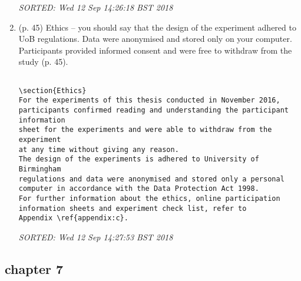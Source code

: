 \documentclass[10pt]{article}
\begin{document}
\begin{enumerate}[noitemsep,topsep=0pt]
\begin{verbatim}
\end{verbatim}
\textit{
SORTED: 
Wed 12 Sep 14:26:18 BST 2018
}
\\






\item (p. 45) Ethics -- you should say that the design of the experiment 
	adhered to UoB regulations. 
	Data were anonymised and stored only on your computer.
	Participants provided informed consent and were free to 
	withdraw from the study	(p. 45).


\begin{verbatim}

\section{Ethics}
For the experiments of this thesis conducted in November 2016, 
participants confirmed reading and understanding the participant information 
sheet for the experiments and were able to withdraw from the experiment 
at any time without giving any reason.
The design of the experiments is adhered to University of Birmingham 
regulations and data were anonymised and stored only a personal 
computer in accordance with the Data Protection Act 1998.
For further information about the ethics, online participation 
information sheets and experiment check list, refer to 
Appendix \ref{appendix:c}.

\end{verbatim}
\textit{
SORTED: 
Wed 12 Sep 14:27:53 BST 2018
}
\\





	
\end{enumerate}













\subsection{chapter 7}
\end{document}
